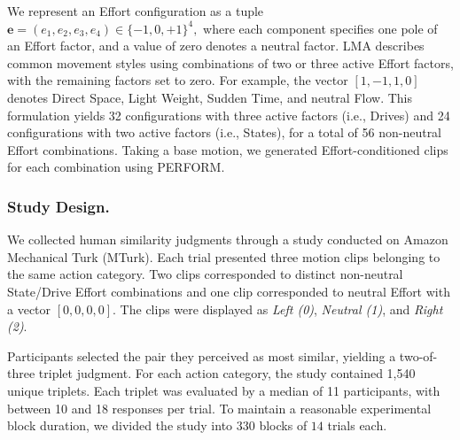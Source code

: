 \documentclass[letterpaper]{article} %
\begin{document}
We represent an Effort configuration as a tuple $\mathbf{e} = (e_1,e_2,e_3,e_4) \in \{-1,0,+1\}^4,$  where each component specifies one pole of an Effort factor, and a value of zero denotes a neutral factor. LMA describes common movement styles using combinations of two or three active Effort factors, with the remaining factors set to zero. For example, the vector $[1,-1,1,0]$ denotes Direct Space, Light Weight, Sudden Time, and neutral Flow.  This formulation yields 32 configurations with three active factors (i.e., Drives) and 24 configurations with two active factors (i.e., States), for a total of 56 non-neutral Effort combinations. Taking a base motion, we generated Effort-conditioned clips for each combination using PERFORM. 


\subsubsection{Study Design.}
We collected human similarity judgments through a study conducted on Amazon Mechanical Turk (MTurk). Each trial presented three motion clips belonging to the same action category. Two clips corresponded to distinct non-neutral State/Drive Effort combinations and one clip corresponded to neutral Effort with a vector $[0,0,0,0]$. The clips were displayed as \emph{Left (0)}, \emph{Neutral (1)}, and \emph{Right (2)}.


Participants selected the pair they perceived as most similar, yielding a two-of-three triplet judgment. For each action category, the study contained 1,540 unique triplets. Each triplet was evaluated by a median of 11 participants, with between 10 and 18 responses per trial.  To maintain a reasonable experimental block duration, we divided the study into $330$ blocks of $14$ trials each.

\end{document}
